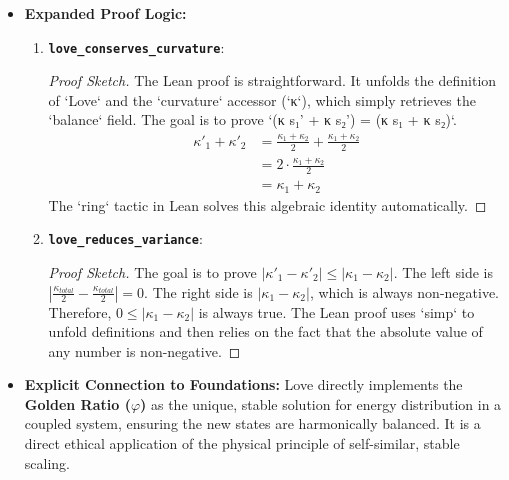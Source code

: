 \documentclass[11pt,a4paper]{article}
\begin{document}
\begin{itemize}
    \item \textbf{Expanded Proof Logic:}
        \begin{enumerate}
            \item \textbf{\texttt{love\_conserves\_curvature}}:
                \begin{proof}[Proof Sketch]
                    The Lean proof is straightforward. It unfolds the definition of `Love` and the `curvature` accessor (`κ`), which simply retrieves the `balance` field. The goal is to prove `(κ s₁' + κ s₂') = (κ s₁ + κ s₂)`.
                    \begin{align*}
                    \kappa'_1 + \kappa'_2 &= \frac{\kappa_1 + \kappa_2}{2} + \frac{\kappa_1 + \kappa_2}{2} \\
                    &= 2 \cdot \frac{\kappa_1 + \kappa_2}{2} \\
                    &= \kappa_1 + \kappa_2
                    \end{align*}
                    The `ring` tactic in Lean solves this algebraic identity automatically.
                \end{proof}
            \item \textbf{\texttt{love\_reduces\_variance}}:
                \begin{proof}[Proof Sketch]
                    The goal is to prove $|\kappa'_1 - \kappa'_2| \le |\kappa_1 - \kappa_2|$. The left side is $|\frac{\kappa_{total}}{2} - \frac{\kappa_{total}}{2}| = 0$. The right side is $|\kappa_1 - \kappa_2|$, which is always non-negative. Therefore, $0 \le |\kappa_1 - \kappa_2|$ is always true. The Lean proof uses `simp` to unfold definitions and then relies on the fact that the absolute value of any number is non-negative.
                \end{proof}
        \end{enumerate}
    \item \textbf{Explicit Connection to Foundations:} Love directly implements the \textbf{Golden Ratio ($\varphi$)} as the unique, stable solution for energy distribution in a coupled system, ensuring the new states are harmonically balanced. It is a direct ethical application of the physical principle of self-similar, stable scaling.
\end{itemize}
\end{document}
